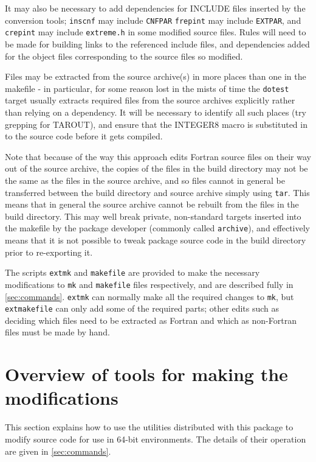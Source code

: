 \documentclass[twoside,11pt]{article}
\newcommand{\htmlref}[2]{#1}
\renewcommand{\_}{\texttt{\symbol{95}}}
\newcommand{\xroutine}[1]{\htmlref{{\tt #1}}{#1}}
\newcommand{\file}[1]{{\tt #1}}
\begin{document}
It may also be necessary to add dependencies for INCLUDE files inserted
by the conversion tools; \xroutine{inscnf} may include \file{CNF\_PAR}
\xroutine{frepint} may include \file{EXT\_PAR}, 
and \xroutine{crepint} may include \file{extreme.h} 
in some modified source files.  
Rules will need to be made for building links to the referenced
include files, and dependencies added for the object files corresponding
to the source files so modified.

Files may be extracted from the source archive(s) in more places than
one in the makefile - in particular, for some reason lost in the
mists of time the {\tt do\_test} target 
usually extracts required files from the source archives explicitly
rather than relying on a dependency.
It will be necessary to identify all such places 
(try grepping for TAR\_OUT), and ensure that
the INTEGER8 macro is substituted in to the source code before it
gets compiled.

Note that because of the way this approach edits Fortran source files on
their way out of the source archive,
the copies of the files in the build directory may not be the same
as the files in the source archive, and so files cannot in general
be transferred between the build directory and source archive
simply using {\tt tar}.
This means that in general the source archive cannot be rebuilt 
from the files in the build directory.
This may well break private, non-standard targets inserted into the
makefile by the package developer (commonly called {\tt archive}),
and effectively means that it is not possible to tweak package source
code in the build directory prior to re-exporting it.

The scripts \xroutine{extmk} and \xroutine{makefile} 
are provided to make the necessary 
modifications to \file{mk} and \file{makefile} files respectively, 
and are described fully in \ref{sec:commands}.
\xroutine{extmk} can normally make all the required changes to \file{mk},
but \xroutine{extmakefile} can only add some of the required parts;
other edits such as deciding which files need to be extracted as Fortran
and which as non-Fortran files must be made by hand.


\section{Overview of tools for making the modifications\label{sec:tools}}

This section explains how to use the utilities distributed with this package
to modify source code for use in 64-bit environments.
The details of their operation are given in \ref{sec:commands}.
\end{document}
